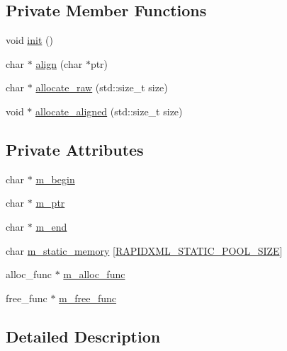 \subsection*{Private Member Functions}
\begin{DoxyCompactItemize}
\item 
void \hyperlink{classrapidxml_1_1memory__pool_a1076043ef092e327e59dd988c1ba82fb}{init} ()
\item 
char $\ast$ \hyperlink{classrapidxml_1_1memory__pool_a317396afc1812f08b64a1dd9cde4039b}{align} (char $\ast$ptr)
\item 
char $\ast$ \hyperlink{classrapidxml_1_1memory__pool_a1aed504a747303352e05f61c6ccbbebb}{allocate\+\_\+raw} (std\+::size\+\_\+t size)
\item 
void $\ast$ \hyperlink{classrapidxml_1_1memory__pool_a4e9cf53fa5f9da3a8f31b754bd94b4ec}{allocate\+\_\+aligned} (std\+::size\+\_\+t size)
\end{DoxyCompactItemize}
\subsection*{Private Attributes}
\begin{DoxyCompactItemize}
\item 
char $\ast$ \hyperlink{classrapidxml_1_1memory__pool_a775205c5faa60b63385c24368d26d4e1}{m\+\_\+begin}
\item 
char $\ast$ \hyperlink{classrapidxml_1_1memory__pool_a4a89ff677c72afc163d1855cefc28013}{m\+\_\+ptr}
\item 
char $\ast$ \hyperlink{classrapidxml_1_1memory__pool_a6c9a83514446842518c9ffb7a38b76eb}{m\+\_\+end}
\item 
char \hyperlink{classrapidxml_1_1memory__pool_aacc5ca734ebfbef7f42251764eb396f4}{m\+\_\+static\+\_\+memory} \mbox{[}\hyperlink{rapidxml_8hpp_a001304844ab478e3b213749fc8d72ca2}{R\+A\+P\+I\+D\+X\+M\+L\+\_\+\+S\+T\+A\+T\+I\+C\+\_\+\+P\+O\+O\+L\+\_\+\+S\+I\+Z\+E}\mbox{]}
\item 
alloc\+\_\+func $\ast$ \hyperlink{classrapidxml_1_1memory__pool_ae8964773675d24f77a808356be773c1d}{m\+\_\+alloc\+\_\+func}
\item 
free\+\_\+func $\ast$ \hyperlink{classrapidxml_1_1memory__pool_af8f41565f4de167eb2f40ca20695f24d}{m\+\_\+free\+\_\+func}
\end{DoxyCompactItemize}


\subsection{Detailed Description}
